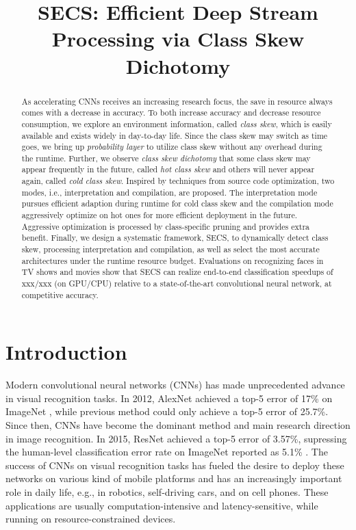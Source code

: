 \documentclass[pageno]{jpaper}
\begin{document}
\title{SECS: Efficient Deep Stream Processing via Class Skew Dichotomy}
\author{}
\date{}
\maketitle

\thispagestyle{empty}

\begin{abstract}
As accelerating CNNs receives an increasing research focus, the save in resource always comes with a decrease in accuracy. To both increase accuracy and decrease resource consumption, we explore an environment information, called \textit{class skew}, which is easily available and exists widely in day-to-day life. Since the class skew may switch as time goes, we bring up \textit{probability layer} to utilize class skew without any overhead during the runtime. Further, we observe \textit{class skew dichotomy} that some class skew may appear frequently in the future, called \textit{hot class skew} and others will never appear again, called \textit{cold class skew}. Inspired by techniques from source code optimization, two modes, i.e., interpretation and compilation, are proposed. The interpretation mode pursues efficient adaption during runtime for cold class skew and the compilation mode aggressively optimize on hot ones for more efficient deployment in the future. Aggressive optimization is processed by class-specific pruning and provides extra benefit. Finally, we design a systematic framework, SECS, to dynamically detect class skew, processing interpretation and compilation, as well as select the most accurate architectures under the runtime resource budget. Evaluations on recognizing faces in TV shows and movies show that SECS can realize end-to-end classification speedups of xxx/xxx (on GPU/CPU) relative to a state-of-the-art convolutional neural network, at competitive accuracy.
\end{abstract}




\section{Introduction}
Modern convolutional neural networks (CNNs) has made unprecedented advance in visual recognition tasks. In 2012, AlexNet \cite{krizhevsky2012imagenet} achieved a top-5 error of 17\% on ImageNet \cite{deng2009imagenet}, while previous method could only achieve a top-5 error of 25.7\%. Since then, CNNs have become the dominant method and main research direction in image recognition. In 2015, ResNet \cite{he2016deep} achieved a top-5 error of 3.57\%, supressing the human-level classification error rate on ImageNet reported as 5.1\% \cite{russakovsky2015imagenet}. The success of CNNs on visual recognition tasks has fueled the desire to deploy these networks on various kind of mobile platforms and has an increasingly important role in daily life, e.g., in robotics, self-driving cars, and on cell phones. These applications are usually computation-intensive and latency-sensitive, while running on resource-constrained devices. 
\end{document}
